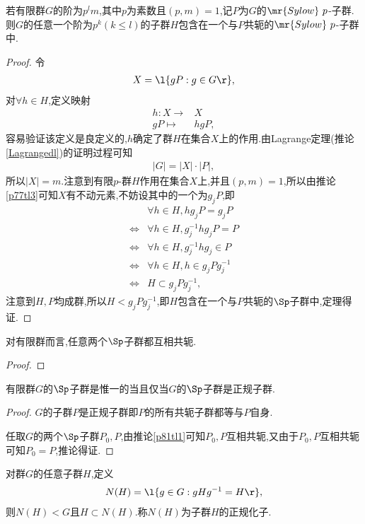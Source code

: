 \begin{theorem}[Sylow第二定理]\label{xldedl}
    若有限群$G$的阶为$p^lm$,其中$p$为素数且$(p,m)=1$,记$P$为$G$的$\mr{Sylow}\ p$-子群.则$G$的任意一个阶为$p^k(k\leq l)$的子群$H$包含在一个与$P$共轭的$\mr{Sylow}\ p$-子群中.
\end{theorem}
\begin{proof}
    令\begin{align*}
        X=\l\{gP:g\in G\r\},
    \end{align*}对$\forall h\in H$,定义映射\begin{align*}
        h:X\to&X\\
        gP\mapsto&hgP,
    \end{align*}容易验证该定义是良定义的,$h$确定了群$H$在集合$X$上的作用.由Lagrange定理(推论\ref{Lagrangedl})的证明过程可知\begin{align*}
        |G|=|X|\cdot|P|,
    \end{align*}所以$|X|=m$.注意到有限$p$-群$H$作用在集合$X$上,并且$(p,m)=1$,所以由推论\ref{p77tl3}可知$X$有不动元素,不妨设其中的一个为$g_jP$,即\begin{align*}
        &\forall h\in H,hg_jP=g_jP\\
        \iff&\forall h\in H,g_j^{-1}hg_jP=P\\
        \iff&\forall h\in H,g_j^{-1}hg_j\in P\\
        \iff&\forall h\in H,h\in g_jPg_j^{-1}\\
        \iff&H\subset g_jPg_j^{-1},
    \end{align*}注意到$H,P$均成群,所以$H<g_jPg_j^{-1}$,即$H$包含在一个与$P$共轭的$\Sp$子群中,定理得证.
\end{proof}
\begin{corollary}\label{p81tl1}
    对有限群而言,任意两个$\Sp$子群都互相共轭.
\end{corollary}
\begin{proof}
    \stars
\end{proof}
\begin{corollary}\label{asdinfjkasdfmk}
    有限群$G$的$\Sp$子群是惟一的当且仅当$G$的$\Sp$子群是正规子群.
\end{corollary}
\begin{proof}
    $G$的子群$P$是正规子群即$P$的所有共轭子群都等与$P$自身.

    任取$G$的两个$\Sp$子群$P_0,P$,由推论\ref{p81tl1}可知$P_0,P$互相共轭,又由于$P_0,P$互相共轭可知$P_0=P$,推论得证.
\end{proof}
\begin{definition}[正规化子]\label{zghz}
    对群$G$的任意子群$H$,定义\begin{align*}
        N(H)=\l\{g\in G:gHg^{-1}=H\r\},
    \end{align*}则$N(H)<G$且$H\subset N(H)$.称$N(H)$为子群$H$的正规化子.
\end{definition}
